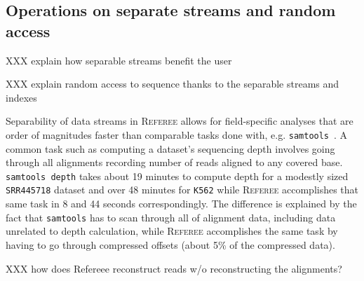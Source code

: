 \documentclass[12pt]{cmuthesis}
\newcommand{\refer}{\textsc{Referee}\xspace}
\begin{document}





  \subsection{Operations on separate streams and random access}


  XXX explain how separable streams benefit the user

  XXX explain random access to sequence thanks to the separable streams and indexes

  Separability of data streams in \refer allows for field-specific analyses that are order of magnitudes faster than comparable tasks done with, e.g. \texttt{samtools}~\cite{SamTools}. A common task such as computing a dataset's sequencing depth involves going through all alignments recording number of reads aligned to any covered base. \texttt{samtools depth} takes about 19 minutes to compute depth for a modestly sized \texttt{SRR445718} dataset and over 48 minutes for \texttt{K562} while \refer accomplishes that same task in 8 and 44 seconds correspondingly. The difference is explained by the fact that \texttt{samtools} has to scan through all of alignment data, including data unrelated to depth calculation, while \refer accomplishes the same task by  having to go through compressed offsets (about 5\% of the compressed data).

  XXX how does Refereee reconstruct reads w/o reconstructing the alignments?
\end{document}
